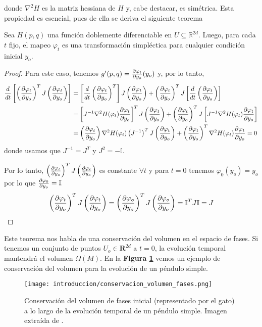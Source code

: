 donde $\nabla^2 H$ es la matriz hessiana de $H$ y, cabe destacar, es simétrica. Esta propiedad es esencial, pues de ella se deriva el siguiente teorema

\begin{theorem}{\label{teo:preservacion_evol}}
  Sea $H(p,q)$ una función doblemente diferenciable en $U\subseteq\mathbb{R}^{2d}$. Luego, para cada $t$ fijo, el mapeo $\varphi_t$ es una transformación simpléctica
  para cualquier condición inicial $y_o$.
\end{theorem}
\begin{proof}
 Para este caso, tenemos $g'(p,q) = \frac{\partial\varphi_t}{\partial y_o}(y_o)$ y, por lo tanto,
 \begin{align*}
  \frac{d}{dt}\left[ \left(\frac{\partial\varphi_t}{\partial y_o}\right)^T J \left(\frac{\partial\varphi_t}{\partial y_o}\right) \right]
  &= \left[\frac{d}{dt}\left(\frac{\partial\varphi_t}{\partial y_o}\right)^T\right] J \left(\frac{\partial\varphi_t}{\partial y_o}\right) + \left(\frac{\partial\varphi_t}{\partial y_o}\right)^T J \left[\frac{d}{dt}\left(\frac{\partial\varphi_t}{\partial y_o}\right)\right] \\
  &= \left[J^{-1} \nabla^2 H(\varphi_t)\frac{\partial\varphi_t}{\partial y_o}\right]^T J \left(\frac{\partial\varphi_t}{\partial y_o}\right) + \left(\frac{\partial\varphi_t}{\partial y_o}\right)^T J \left[J^{-1} \nabla^2 H(\varphi_t)\frac{\partial\varphi_t}{\partial y_o}\right] \\
  &= \left(\frac{\partial\varphi_t}{\partial y_o}\right)\nabla^2 H(\varphi_t)\left(J^{-1} \right)^T J \left(\frac{\partial\varphi_t}{\partial y_o}\right) + \left(\frac{\partial\varphi_t}{\partial y_o}\right)^T \nabla^2 H(\varphi_t)\frac{\partial\varphi_t}{\partial y_o} = 0
 \end{align*}
 donde usamos que $J^{-1} = J^T$ y $J^2 = -\mathbb{I}$.

 Por lo tanto, $\left(\frac{\partial\varphi_t}{\partial y_o}\right)^T J \left(\frac{\partial\varphi_t}{\partial y_o}\right)$ es constante $\forall t$ y para $t=0$ tenemos $\varphi_0(y_o) = y_o$ por lo que $\frac{\partial\varphi_0}{\partial y_o}=\mathbb{I}$
 \[ \left(\frac{\partial\varphi_t}{\partial y_o}\right)^T J \left(\frac{\partial\varphi_t}{\partial y_o}\right) = \left(\frac{\partial\varphi_o}{\partial y_o}\right)^T J \left(\frac{\partial\varphi_o}{\partial y_o}\right) = \mathbb{I}^T J \mathbb{I} = J\]
\end{proof}

Este teorema nos habla de una conservación del volumen en el espacio de fases.
Si tenemos un conjunto de puntos $U_o\in\mathbf{R}^{2d}$ a $t=0$, la evolución temporal mantendrá el volumen $\Omega(M)$.
En la \textbf{Figura \ref{fig:cons_gatito}} vemos un ejemplo de conservación del volumen para la evolución de un péndulo simple.

\begin{figure}[H]
	\centering	%
	\texttt{[image: introduccion/conservacion\_volumen\_fases.png]}
	\caption{Conservación del volumen de fases inicial (representado por el gato) a lo largo de la evolución temporal de un péndulo simple.
	Imagen extraída de \cite[pp. 185]{BOOK:SPR_INT}.}
	\label{fig:cons_gatito}
\end{figure}

